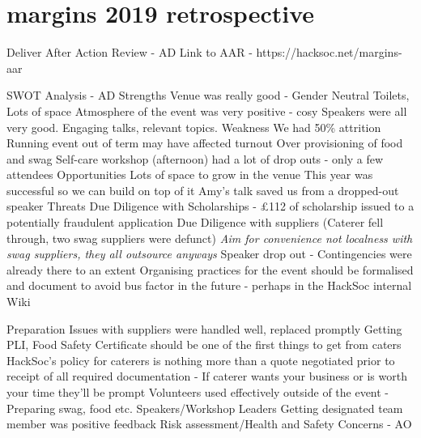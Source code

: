 \documentclass[11pt]{meetingmins}
\begin{document}
\maketitle

\section{margins 2019 retrospective}
\begin{items}
	\item Deliver After Action Review - AD
		\subitem Link to AAR - https://hacksoc.net/margins-aar
	\item SWOT Analysis - AD
		\subitem Strengths
			\subsubitem Venue was really good - Gender Neutral Toilets, Lots of space
			\subsubitem Atmosphere of the event was very positive - cosy
			\subsubitem Speakers were all very good. Engaging talks, relevant topics.
		\subitem Weakness
			\subsubitem We had 50\% attrition
			\subsubitem Running event out of term may have affected turnout
			\subsubitem Over provisioning of food and swag
			\subsubitem Self-care workshop (afternoon) had a lot of drop outs - only a few attendees
		\subitem Opportunities
			\subsubitem Lots of space to grow in the venue
			\subsubitem This year was successful so we can build on top of it
			\subsubitem Amy's talk saved us from a dropped-out speaker
		\subitem Threats
			\subsubitem Due Diligence with Scholarships - \pounds112 of scholarship issued to a potentially fraudulent application
			\subsubitem Due Diligence with suppliers (Caterer fell through, two swag suppliers were defunct) \textit{Aim for convenience not localness with swag suppliers, they all outsource anyways}
			\subsubitem Speaker drop out - Contingencies were already there to an extent
			\subsubitem Organising practices for the event should be formalised and document to avoid bus factor in the future - perhaps in the HackSoc internal Wiki
	\item Preparation
		\subitem Issues with suppliers were handled well, replaced promptly
			\subsubitem Getting PLI, Food Safety Certificate should be one of the first things to get from caters
			\subsubitem HackSoc's policy for caterers is nothing more than a quote negotiated prior to receipt of all required documentation - If caterer wants your business or is worth your time they'll be prompt
		\subitem Volunteers used effectively outside of the event - Preparing swag, food etc.
		\subitem Speakers/Workshop Leaders Getting designated team member was positive feedback
		\subitem Risk assessment/Health and Safety Concerns - AO

\end{items}
\end{document}
